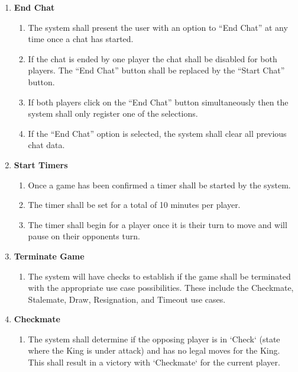 \documentclass[12pt, titlepage]{article}
\begin{document}
\begin{enumerate}[{UC}1.]
        	\item \textbf{End Chat}
        	\begin{enumerate}[{FR}1., resume]
        		\item The system shall present the user with an option to ``End Chat'' at any time once a chat has started.
        		\item If the chat is ended by one player the chat shall be disabled for both players. The ``End Chat'' button shall be replaced by the ``Start Chat'' button.
        		\item If both players click on the ``End Chat'' button simultaneously then the system shall only register one of the selections.
        		\item If the ``End Chat'' option is selected, the system shall clear all previous chat data.
        	\end{enumerate}
        	
        	\item \textbf{Start Timers}
        	\begin{enumerate}[{FR}1., resume]
        		\item Once a game has been confirmed a timer shall be started by the system.
        		\item The timer shall be set for a total of 10 minutes per player.
        		\item The timer shall begin for a player once it is their turn to move and will pause on their opponents turn.
        	\end{enumerate}
        	
        	\item \textbf{Terminate Game}
        	\begin{enumerate}[{FR}1., resume]
        	    \item The system will have checks to establish if the game shall be terminated with the appropriate use case possibilities. These include the Checkmate, Stalemate, Draw, Resignation, and Timeout use cases.
        	\end{enumerate}
        	
        	\item \textbf{Checkmate}
        	\begin{enumerate}[{FR}1., resume]
        		\item The system shall determine if the opposing player is in `Check` \cite{ChessRules} (state where the King is under attack) and has no legal moves for the King. This shall result in a victory with `Checkmate` for the current player.
        	\end{enumerate}
        

\end{enumerate}
\end{document}
